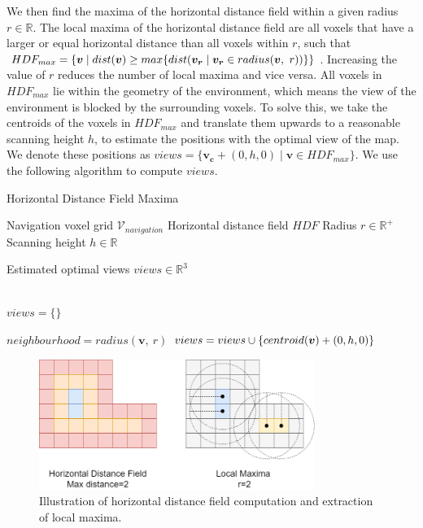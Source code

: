 We then find the maxima of the horizontal distance field within a given radius \(r \in \mathbb{R}\).  The local maxima of the horizontal distance field are all voxels that have a larger or equal horizontal distance than all voxels within \(r\), such that \(HDF_{max} = \{\boldsymbol{v} \mid dist(\boldsymbol{v}) \geq max \{dist(\boldsymbol{v_{r}} \mid \boldsymbol{v_{r}} \in radius(\boldsymbol{v},\ r))\}\}\). Increasing the value of \(r\) reduces the number of local maxima and vice versa. All voxels in \(HDF_{max}\) lie within the geometry of the environment, which means the view of the environment is blocked by the surrounding voxels. To solve this, we take the centroids of the voxels in \(HDF_{max}\) and translate them upwards to a reasonable scanning height \(h\), to estimate the positions with the optimal view of the map. We denote these positions as \(views = \{\boldsymbol{v_c} + (0, h, 0) \mid \boldsymbol{v} \in HDF_{max}\}\). We use the following algorithm to compute \(views\).

\begin{algorithm}
    \caption{Horizontal Distance Field Maxima}
    \begin{algorithmic}

    \Require \quad Navigation voxel grid \(\mathcal{V}_{navigation}\)
    \Require \quad Horizontal distance field \(HDF\)
    \Require \quad Radius \(r \in \mathbb{R}^+\)
    \Require \quad Scanning height \(h \in \mathbb{R}\)

    \Ensure \quad Estimated optimal views $views \in \mathbb{R}^3$

    \\

    \State $views = \{\}$

        \State \(neighbourhood = radius(\boldsymbol{v},\ r)\)
         
            \State $views = views \cup \{centroid(\boldsymbol{v}) + (0, h, 0)\}$
        \EndIf
    \EndFor
    
    \end{algorithmic}
\end{algorithm}

\begin{figure}[h]
    \centering
    \includegraphics*[width=0.8\textwidth]{./fig/hdf_simple.png}
    \caption{Illustration of horizontal distance field computation and extraction of local maxima.}
    \label{fig:hdf_simple}
\end{figure}

